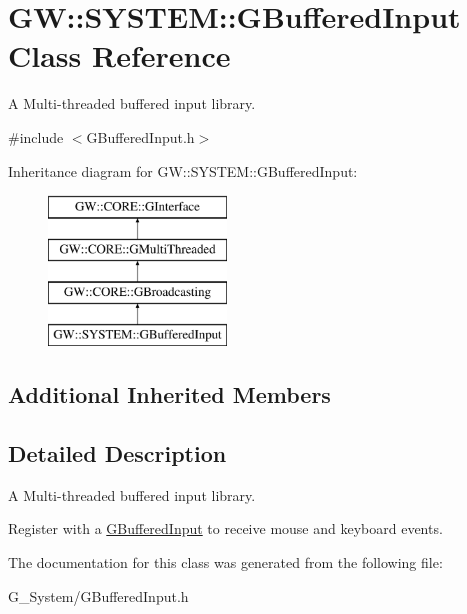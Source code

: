 \hypertarget{class_g_w_1_1_s_y_s_t_e_m_1_1_g_buffered_input}{}\section{GW\+:\+:S\+Y\+S\+T\+EM\+:\+:G\+Buffered\+Input Class Reference}
\label{class_g_w_1_1_s_y_s_t_e_m_1_1_g_buffered_input}


A Multi-\/threaded buffered input library.  




{\ttfamily \#include $<$G\+Buffered\+Input.\+h$>$}

Inheritance diagram for GW\+:\+:S\+Y\+S\+T\+EM\+:\+:G\+Buffered\+Input\+:\begin{figure}[H]
\begin{center}
\leavevmode
\includegraphics[height=4.000000cm]{class_g_w_1_1_s_y_s_t_e_m_1_1_g_buffered_input}
\end{center}
\end{figure}
\subsection*{Additional Inherited Members}


\subsection{Detailed Description}
A Multi-\/threaded buffered input library. 

Register with a \mbox{\hyperlink{class_g_w_1_1_s_y_s_t_e_m_1_1_g_buffered_input}{G\+Buffered\+Input}} to receive mouse and keyboard events. 

The documentation for this class was generated from the following file\+:\begin{DoxyCompactItemize}
\item 
G\+\_\+\+System/G\+Buffered\+Input.\+h\end{DoxyCompactItemize}
